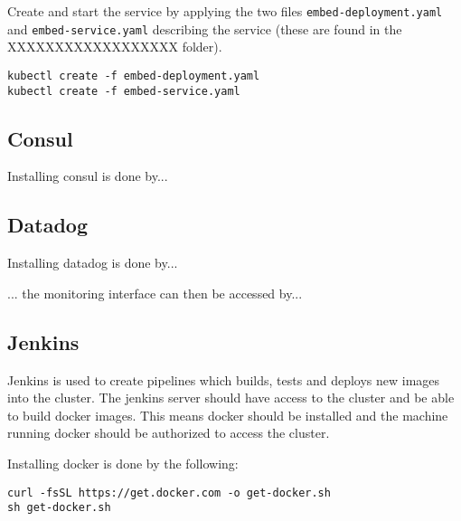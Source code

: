\documentclass[Report.tex]{subfiles}
\begin{document}
Create and start the service by applying the two files \texttt{embed-deployment.yaml} and \texttt{embed-service.yaml} describing the service (these are found in the XXXXXXXXXXXXXXXXXX folder).
\begin{lstlisting}[style=terminal]
kubectl create -f embed-deployment.yaml
kubectl create -f embed-service.yaml
\end{lstlisting}


\subsection{Consul}
Installing consul is done by...


\subsection{Datadog}
Installing datadog is done by...

... the monitoring interface can then be accessed by...

\subsection{Jenkins}
Jenkins is used to create pipelines which builds, tests and deploys new images into the cluster.
The jenkins server should have access to the cluster and be able to build docker images. This means docker should be installed and the machine running docker should be authorized to access the cluster.

Installing docker is done by the following:
\begin{lstlisting}[style=terminal]
curl -fsSL https://get.docker.com -o get-docker.sh
sh get-docker.sh
\end{lstlisting}
\end{document}
